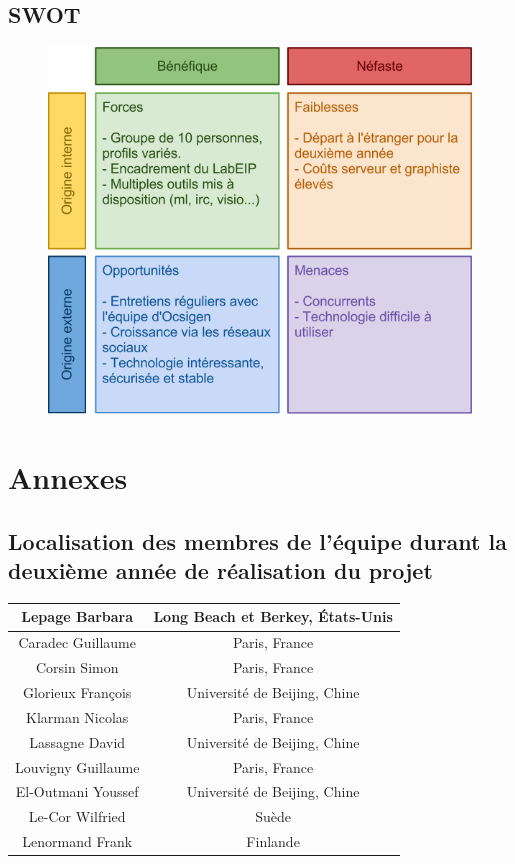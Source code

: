 \documentclass{life-fr}
\begin{document}
\section{SWOT}

\begin{figure}[H]
  \begin{center}
    \includegraphics[width=14cm]{img/swot_fr.png}
  \end{center}
\end{figure}


\chapter{Annexes}

\section{Localisation des membres de l'équipe durant la deuxième année de réalisation du projet}

\begin{tabular}{|c|c|}
  \hline
  Lepage Barbara & Long Beach et Berkey, États-Unis\\
  \hline
  Caradec Guillaume & Paris, France\\
  \hline
  Corsin Simon & Paris, France\\
  \hline
  Glorieux François & Université de Beijing, Chine\\
  \hline
  Klarman Nicolas & Paris, France\\
  \hline
  Lassagne David & Université de Beijing, Chine\\
  \hline
  Louvigny Guillaume & Paris, France\\
  \hline
  El-Outmani Youssef & Université de Beijing, Chine\\
  \hline
  Le-Cor Wilfried & Suède\\
  \hline
  Lenormand Frank & Finlande\\
  \hline
\end{tabular}
\end{document}

